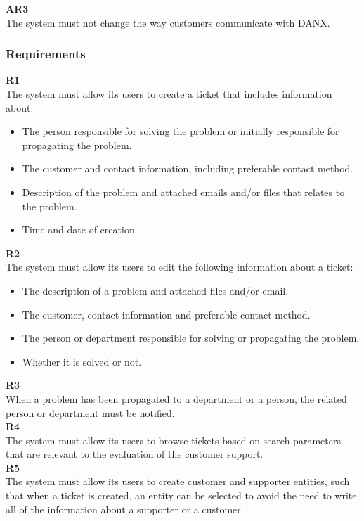 \textbf{AR3} \\
The system must not change the way customers communicate with DANX.

\subsubsection{Requirements}
\textbf{R1} \\
The system must allow its users to create a ticket that includes information about:
\begin{itemize}
\item The person responsible for solving the problem or initially responsible for propagating the problem.
\item The customer and contact information, including preferable contact method.
\item Description of the problem and attached emails and/or files that relates to the problem.
\item Time and date of creation.
\end{itemize}

\textbf{R2} \\
The system must allow its users to edit the following information about a ticket:
\begin{itemize}
\item The description of a problem and attached files and/or email.
\item The customer, contact information and preferable contact method.
\item The person or department responsible for solving or propagating the problem.
\item Whether it is solved or not.
\end{itemize}

\textbf{R3} \\
When a problem has been propagated to a department or a person, the related person or department must be notified. \\

\textbf{R4} \\
The system must allow its users to browse tickets based on search parameters that are relevant to the evaluation of the customer support. \\

\textbf{R5} \\
The system must allow its users to create customer and supporter entities, such that when a ticket is created, an entity can be selected to avoid the need to write all of the information about a supporter or a customer. \\


